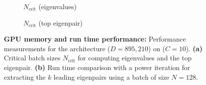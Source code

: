 \begin{figure}[tb]
  \begin{subfigure}[t]{0.35\linewidth}
    \centering
    \caption{}
    \label{subfig:performance-cifar10-3c3d-cuda_main_1}

    \vspace{-\baselineskip}
    \begin{normalsize}
      $N_{\text{crit}}$ (eigenvalues)
    \end{normalsize}
    \vspace{0.15\baselineskip}

    \begin{normalsize}
      
    \end{normalsize}

    \vspace{\baselineskip}

    \begin{normalsize}
      $N_{\text{crit}}$ (top eigenpair)
    \end{normalsize}
    \vspace{0.15\baselineskip}

    \begin{normalsize}
      
    \end{normalsize}

    \vspace{3.6\baselineskip}

  \end{subfigure}
  \begin{subfigure}[t]{0.64\linewidth}
    \centering
    \caption{}
    \label{subfig:performance-cifar10-3c3d-cuda_main_2}

    \vspace{-1.5\baselineskip}

    
    
  \end{subfigure}

  \vspace{-7ex}
  \caption{\textbf{GPU memory and run time performance:}
  Performance measurements for the
  \threecthreed architecture ($D = 895,\!210$)
  on \cifarten ($C=10$).
  \textbf{(a)} Critical batch sizes $N_{\text{crit}}$
    for computing eigenvalues and the top eigenpair.
    \textbf{(b)} Run time comparison with a power iteration for extracting
    the $k$ leading eigenpairs using a batch of size $N=128$.
  }
  \label{fig:performance-cifar10-3c3d-cuda_main}
\end{figure}

